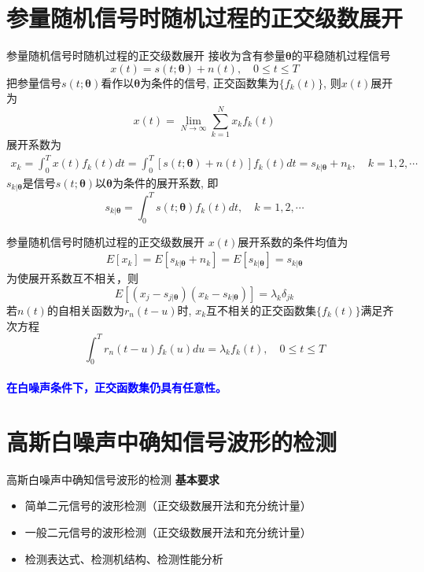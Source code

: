\section{参量随机信号时随机过程的正交级数展开}

\begin{frame}[shrink]{参量随机信号时随机过程的正交级数展开}
接收为含有参量$\bm{\theta}$的平稳随机过程信号
\[x(t)=s(t; \bm{\theta})+n(t),\quad 0\le t\le T \]
把参量信号$s(t; \bm{\theta})$看作以$\bm{\theta}$为条件的信号, 正交函数集为$\{f_k(t)\}$, 则$x(t)$展开为
\[x(t)=\lim\limits_{N\to\infty}\sum_{k=1}^{N}x_kf_k(t) \]
展开系数为
\begin{align*}
x_k=\int_{0}^{T}x(t)f_k(t)dt=\int_{0}^{T}[s(t; \bm{\theta})+n(t)]f_k(t)dt=s_{k|\bm{\theta}}+n_k,\quad k=1,2,\cdots
\end{align*}
$s_{k|\bm{\theta}}$是信号$s(t; \bm{\theta})$以$\bm{\theta}$为条件的展开系数, 即
\[s_{k|\bm{\theta}}=\int_{0}^{T}s(t; \bm{\theta})f_k(t)dt,\quad  k=1,2,\cdots \]
\end{frame}

\begin{frame}[shrink]{参量随机信号时随机过程的正交级数展开}
$x(t)$展开系数的条件均值为
\begin{align*}
E[x_k]=E[s_{k|\bm{\theta}}+n_k]=E[s_{k|\bm{\theta}}]=s_{k|\bm{\theta}}
\end{align*}
为使展开系数互不相关，则
\[E[(x_j-s_{j|\bm{\theta}})(x_k-s_{k|\bm{\theta}})]=\lambda_k\delta_{jk} \]
若$n(t)$的自相关函数为$r_n(t-u)$时, $x_k$互不相关的正交函数集$\{f_k(t)\}$满足齐次方程
\[\int_{0}^{T}r_n(t-u)f_k(u)du=\lambda_kf_k(t), \quad 0\le t\le T \]
~\\
\textbf{\textcolor{blue}{在白噪声条件下，正交函数集仍具有任意性。}}
\end{frame}

\section{高斯白噪声中确知信号波形的检测}

\begin{frame}{高斯白噪声中确知信号波形的检测}
\textbf{基本要求}
\vspace{0.5cm}
\begin{itemize}
	\setlength{\itemsep}{.5cm}
	\item 简单二元信号的波形检测（正交级数展开法和充分统计量）
	\item 一般二元信号的波形检测（正交级数展开法和充分统计量）
	\item 检测表达式、检测机结构、检测性能分析
\end{itemize}
\end{frame}

